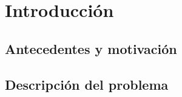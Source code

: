 \chapter{Introducci\'on}
\label{cap:introduccion}

\section{Antecedentes y motivaci\'on}
\label{intro:motivacion}
\begin{comment}
En 1981 el Sr. Marcelo Pardo Brown es contratado por la Universidad para crear el Departamento de Ingeniería Informática y la carrera de Ingeniería Civil en Informática. Oficialmente, el Departamento fue creado mediante el decreto 286 del 7 de mayo de 1982 y su primer director fue el Sr. Pardo. Ese mismo año, el Departamento asume la tutela de la carrera de Ingeniería de Ejecución en Computación e Informática \citep{Codishetal2000}.
\end{comment}


\section{Descripci\'on del problema}
\label{intro:problema}
\begin{comment}
La carrera de Ingeniería Civil en Informática se crearía oficialmente por Resolución 2324 de 1983.  Los primeros Ingenieros Civiles en Informática de la USACH comenzaron a titularse en el año 1987.

La creación del Departamento permitió entre otras cosas la implementación de un plan de contratación de profesores Jornada Completa y la elaboración de un plan de equipamiento computacional dedicado a las tareas académicas del Departamento. Hasta 1983, los alumnos realizaban sus tareas computacionales usando exclusivamente los recursos Computacionales de SECOM, que en ese entonces consistían principalmente en un computador IBM 370/145 con 256 Kilobytes de memoria. A mediados de los 80, el Departamento adquirió un computador VAX 730 que tenía 2 Megabytes de memoria RAM con el sistema operativo VMS. Además, se habilitó un primer centro de operaciones computacionales y las salas de terminales para uso exclusivo de los alumnos del Departamento.
\end{comment}

